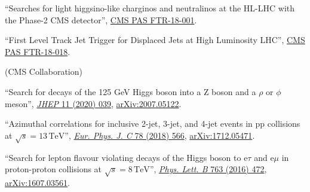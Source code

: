 \begin{description}[leftmargin=12pt,font=\normalfont\textit]
\begin{description}[leftmargin=12pt,font=\normalfont,labelsep=0em]
\item ``Searches for light higgsino-like charginos and neutralinos at the HL-LHC with the Phase-2 CMS detector'', \href{https://cds.cern.ch/record/2648538}{CMS PAS FTR-18-001}.
\item ``First Level Track Jet Trigger for Displaced Jets at High Luminosity LHC'', \href{https://cds.cern.ch/record/2647987}{CMS PAS FTR-18-018}.
\end{description}
\item[FNAL institutional review leader:] (CMS Collaboration)
\begin{description}[leftmargin=12pt,font=\normalfont,labelsep=0em]
\item ``Search for decays of the 125 GeV Higgs boson into a Z boson and a $\rho$ or $\phi$ meson'', \href{https://doi.org/10.1007/JHEP11(2020)039}{\emph{JHEP} 11 (2020) 039}, \href{https://arxiv.org/abs/2007.05122}{arXiv:2007.05122}.
\item ``Azimuthal correlations for inclusive 2-jet, 3-jet, and 4-jet events in pp collisions at $\sqrt{s} = 13\,\text{TeV}$'', \href{http://dx.doi.org/10.1140/epjc/s10052-018-6033-4}{\emph{Eur. Phys. J. C} 78 (2018) 566}, \href{http://arxiv.org/abs/1712.05471}{arXiv:1712.05471}.
\item ``Search for lepton flavour violating decays of the Higgs boson to e$\tau$ and e$\mu$ in proton-proton collisions at $\sqrt{s} = 8\,\text{TeV}$'', \href{http://dx.doi.org/10.1016/j.physletb.2016.09.062}{\emph{Phys. Lett. B} 763 (2016) 472}, \href{http://arxiv.org/abs/1607.03561}{arXiv:1607.03561}.
\end{description}
\end{description}
